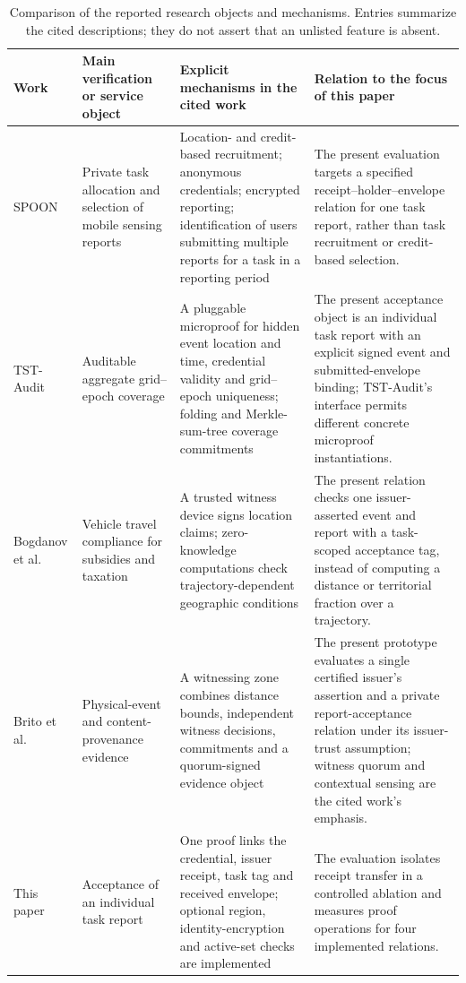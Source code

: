 \begin{table}[t]
\centering\small
\caption{Comparison of the reported research objects and mechanisms. Entries summarize the cited descriptions; they do not assert that an unlisted feature is absent.}\label{tab:comparison-context}
\begin{tabularx}{\textwidth}{@{}p{}p{}p{}X@{}}
\toprule
Work & Main verification or service object & Explicit mechanisms in the cited work & Relation to the focus of this paper \\\midrule
SPOON~\citep{Ni2020SPOON} & Private task allocation and selection of mobile sensing reports & Location- and credit-based recruitment; anonymous credentials; encrypted reporting; identification of users submitting multiple reports for a task in a reporting period & The present evaluation targets a specified receipt--holder--envelope relation for one task report, rather than task recruitment or credit-based selection. \\
TST-Audit~\citep{He2026TSTAudit} & Auditable aggregate grid--epoch coverage & A pluggable microproof for hidden event location and time, credential validity and grid--epoch uniqueness; folding and Merkle-sum-tree coverage commitments & The present acceptance object is an individual task report with an explicit signed event and submitted-envelope binding; TST-Audit's interface permits different concrete microproof instantiations. \\
Bogdanov et al.~\citep{Bogdanov2025VehiclePolicy} & Vehicle travel compliance for subsidies and taxation & A trusted witness device signs location claims; zero-knowledge computations check trajectory-dependent geographic conditions & The present relation checks one issuer-asserted event and report with a task-scoped acceptance tag, instead of computing a distance or territorial fraction over a trajectory. \\
Brito et al.~\citep{Brito2026ContentProvenance} & Physical-event and content-provenance evidence & A witnessing zone combines distance bounds, independent witness decisions, commitments and a quorum-signed evidence object & The present prototype evaluates a single certified issuer's assertion and a private report-acceptance relation under its issuer-trust assumption; witness quorum and contextual sensing are the cited work's emphasis. \\
This paper & Acceptance of an individual task report & One proof links the credential, issuer receipt, task tag and received envelope; optional region, identity-encryption and active-set checks are implemented & The evaluation isolates receipt transfer in a controlled ablation and measures proof operations for four implemented relations. \\
\bottomrule
\end{tabularx}
\end{table}

